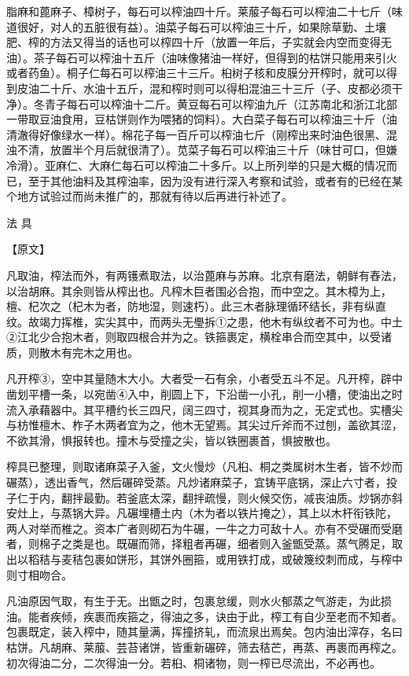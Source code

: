 \documentclass[12pt,UTF8]{ctexbook}
\begin{document}
脂麻和蓖麻子、樟树子，每石可以榨油四十斤。莱菔子每石可以榨油二十七斤（味道很好，对人的五脏很有益）。油菜子每石可以榨油三十斤，如果除草勤、土壤肥、榨的方法又得当的话也可以榨四十斤（放置一年后，子实就会内空而变得无油）。茶子每石可以榨油十五斤（油味像猪油一样好，但得到的枯饼只能用来引火或者药鱼）。桐子仁每石可以榨油三十三斤。桕树子核和皮膜分开榨时，就可以得到皮油二十斤、水油十五斤，混和榨时则可以得桕混油三十三斤（子、皮都必须干净）。冬青子每石可以榨油十二斤。黄豆每石可以榨油九斤（江苏南北和浙江北部一带取豆油食用，豆枯饼则作为喂猪的饲料）。大白菜子每石可以榨油三十斤（油清澈得好像绿水一样）。棉花子每一百斤可以榨油七斤（刚榨出来时油色很黑、混浊不清，放置半个月后就很清了）。苋菜子每石可以榨油三十斤（味甘可口，但嫌冷滑）。亚麻仁、大麻仁每石可以榨油二十多斤。以上所列举的只是大概的情况而已，至于其他油料及其榨油率，因为没有进行深入考察和试验，或者有的已经在某个地方试验过而尚未推广的，那就有待以后再进行补述了。

法 具

【原文】

凡取油，榨法而外，有两镬煮取法，以治蓖麻与苏麻。北京有磨法，朝鲜有舂法，以治胡麻。其余则皆从榨出也。凡榨木巨者围必合抱，而中空之。其木樟为上，檀、杞次之（杞木为者，防地湿，则速朽）。此三木者脉理循环结长，非有纵直纹。故竭力挥椎，实尖其中，而两头无璺拆①之患，他木有纵纹者不可为也。中土②江北少合抱木者，则取四根合并为之。铁箍裹定，横栓串合而空其中，以受诸质，则散木有完木之用也。

凡开榨③，空中其量随木大小。大者受一石有余，小者受五斗不足。凡开榨，辟中凿划平槽一条，以宛凿④入中，削圆上下，下沿凿一小孔，削一小槽，使油出之时流入承藉器中。其平槽约长三四尺，阔三四寸，视其身而为之，无定式也。实槽尖与枋惟檀木、柞子木两者宜为之，他木无望焉。其尖过斤斧而不过刨，盖欲其涩，不欲其滑，惧报转也。撞木与受撞之尖，皆以铁圈裹首，惧披散也。

榨具已整理，则取诸麻菜子入釜，文火慢炒（凡桕、桐之类属树木生者，皆不炒而碾蒸），透出香气，然后碾碎受蒸。凡炒诸麻菜子，宜铸平底锅，深止六寸者，投子仁于内，翻拌最勤。若釜底太深，翻拌疏慢，则火候交伤，减丧油质。炒锅亦斜安灶上，与蒸锅大异。凡碾埋槽土内（木为者以铁片掩之），其上以木杆衔铁陀，两人对举而椎之。资本广者则砌石为牛碾，一牛之力可敌十人。亦有不受碾而受磨者，则棉子之类是也。既碾而筛，择粗者再碾，细者则入釜甑受蒸。蒸气腾足，取出以稻秸与麦秸包裹如饼形，其饼外圈箍，或用铁打成，或破篾绞刺而成，与榨中则寸相吻合。

凡油原因气取，有生于无。出甑之时，包裹怠缓，则水火郁蒸之气游走，为此损油。能者疾倾，疾裹而疾箍之，得油之多，诀由于此，榨工有自少至老而不知者。包裹既定，装入榨中，随其量满，挥撞挤轧，而流泉出焉矣。包内油出滓存，名曰枯饼。凡胡麻、莱菔、芸苔诸饼，皆重新碾碎，筛去秸芒，再蒸、再裹而再榨之。初次得油二分，二次得油一分。若桕、桐诸物，则一榨已尽流出，不必再也。
\end{document}
